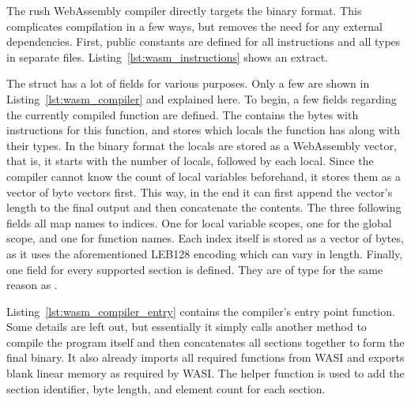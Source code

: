 The rush WebAssembly compiler directly targets the binary format.
This complicates compilation in a few ways, but removes the need for any external dependencies.
First, public constants are defined for all instructions and all types in separate files.
Listing~\ref{lst:wasm_instructions} shows an extract.

The  struct has a lot of fields for various purposes.
Only a few are shown in Listing~\ref{lst:wasm_compiler} and explained here.
To begin, a few fields regarding the currently compiled function are defined.
The  contains the bytes with instructions for this function, and  stores which locals the function has along with their types.
In the binary format the locals are stored as a WebAssembly vector, that is, it starts with the number of locals, followed by each local.
Since the compiler cannot know the count of local variables beforehand, it stores them as a vector of byte vectors first.
This way, in the end it can first append the vector's length to the final output and then concatenate the contents.
The three following fields all map names to indices.
One for local variable scopes, one for the global scope, and one for function names.
Each index itself is stored as a vector of bytes, as it uses the aforementioned LEB128 encoding which can vary in length.
Finally, one field for every supported section is defined.
They are of type  for the same reason as .


Listing~\ref{lst:wasm_compiler_entry} contains the compiler's entry point function.
Some details are left out, but essentially it simply calls another method to compile the program itself and then concatenates all sections together to form the final binary.
It also already imports all required functions from WASI and exports blank linear memory as required by WASI.
The  helper function is used to add the section identifier, byte length, and element count for each section.



